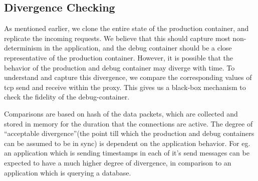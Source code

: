 
\subsection{Divergence Checking}
\label{sec:divergenceChecking}

As mentioned earlier, we clone the entire state of the production container, and replicate the incoming requests. 
We believe that this should capture most non-determinism in the application, and the debug container should be a close representative of the production container. 
However, it is possible that the behavior of the production and debug container may diverge with time.
To understand and capture this divergence, we compare the corresponding values of tcp send and receive within the proxy.
This gives us a black-box mechanism to check the fidelity of the debug-container.

Comparisons are based on hash of the data packets, which are collected and stored in memory for the duration that the connections are active.
The degree of ``acceptable divergence''(the point till which the production and debug containers can be assumed to be in sync) is dependent on the application behavior. 
For eg. an application which is sending timestamps in each of it's send messages can be expected to have a much higher degree of divergence, in comparison to an application which is querying a database.

